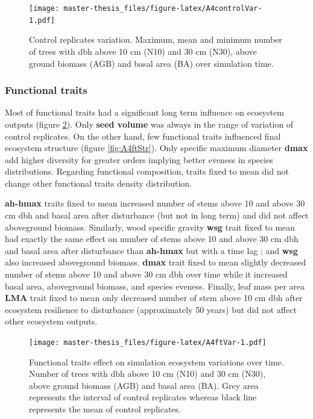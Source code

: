 \documentclass[12pt,]{article}
\theoremstyle{definition}
\theoremstyle{definition}
\theoremstyle{remark}
\begin{document}
\begin{figure}[htbp]
\centering
\texttt{[image: master-thesis\_files/figure-latex/A4controlVar-1.pdf]}
\caption{\label{fig:A4controlVar}Control replicates variation. Maximum, mean
and minimum number of trees with dbh above 10 cm (N10) and 30 cm (N30),
above ground biomass (AGB) and basal area (BA) over simulation time.}
\end{figure}

\subsubsection{Functional traits}\label{functional-traits}

Most of functional traits had a significant long term influence on
ecosystem outputs (figure \ref{fig:A4ftVar}). Only \textbf{seed volume}
was always in the range of variation of control replicates. On the other
hand, few functional traits influenced final ecosystem structure (figure
\ref{fig:A4ftStr}). Only specific maximum diameter \textbf{dmax} add
higher diversity for greater orders implying better eveness in species
distributions. Regarding functional composition, traits fixed to mean
did not change other functional traits density distribution.

\textbf{ah-hmax} traits fixed to mean increased number of stems above 10
and above 30 cm dbh and basal area after disturbance (but not in long
term) and did not affect aboveground biomass. Similarly, wood specific
gravity \textbf{wsg} trait fixed to mean had exactly the same effect on
number of stems above 10 and above 30 cm dbh and basal area after
disturbance than \textbf{ah-hmax} but with a time lag ; and \textbf{wsg}
also increased aboveground biomass. \textbf{dmax} trait fixed to mean
slightly decreased number of stems above 10 and above 30 cm dbh over
time while it increased basal area, aboveground biomass, and species
eveness. Finally, leaf mass per area \textbf{LMA} trait fixed to mean
only decreased number of stem above 10 cm dbh after ecosystem resilience
to disturbance (approximately 50 years) but did not affect other
ecosystem outputs.

\begin{figure}[htbp]
\centering
\texttt{[image: master-thesis\_files/figure-latex/A4ftVar-1.pdf]}
\caption{\label{fig:A4ftVar}Functional traits effect on simulation ecosystem
variations over time. Number of trees with dbh above 10 cm (N10) and 30
cm (N30), above ground biomass (AGB) and basal area (BA). Grey area
represents the interval of control replicates whereas black line
represents the mean of control replicates.}
\end{figure}
\end{document}
